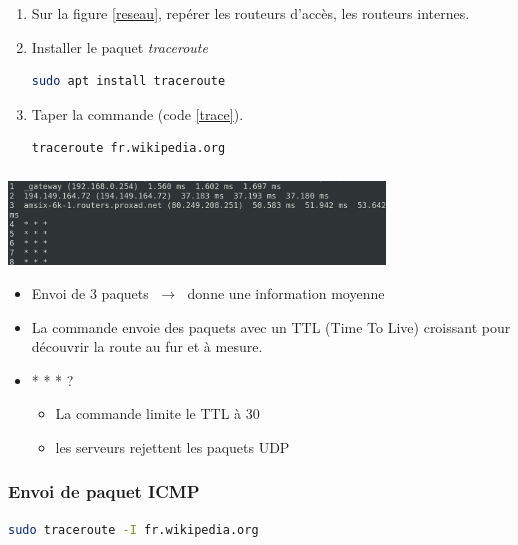 \documentclass[svgnames,11pt]{beamer}
\begin{document}
\begin{frame}[fragile]
    \frametitle{}

    \begin{activite}
        \begin{enumerate}
            \item Sur la figure \ref{reseau}, repérer les routeurs d'accès, les routeurs internes.
            \item Installer le paquet \emph{traceroute}
            \begin{center}
                \begin{lstlisting}[language=bash]
sudo apt install traceroute
                \end{lstlisting}
                \label{ip}
            \end{center}
            \item Taper la commande (code \ref{trace}).
            \begin{center}
                \begin{lstlisting}[language=bash]
traceroute fr.wikipedia.org
                \end{lstlisting}
                \label{trace}
            \end{center}
        \end{enumerate}
        \end{activite}

\end{frame}
\begin{frame}
    \frametitle{}

    \begin{center}
        \centering
        \includegraphics[width=10cm]{ressources/trace.png}
        \label{IMG}
    \end{center}
\begin{itemize}
    \item Envoi de 3 paquets $\;\rightarrow\;$ donne une information moyenne
    \item La commande envoie des paquets avec un TTL (Time To Live) croissant pour découvrir la route au fur et à mesure.
    \item * * * ?
    \begin{itemize}
        \item La commande limite le TTL à 30
        \item les serveurs rejettent les paquets UDP
    \end{itemize} 
\end{itemize}
\end{frame}
\begin{frame}[fragile]
    \frametitle{Envoi de paquet ICMP}

    \begin{center}
        \begin{lstlisting}[language=bash]
sudo traceroute -I fr.wikipedia.org        
        \end{lstlisting}
        \label{moncode}
    \end{center}

\end{frame}
\end{document}
